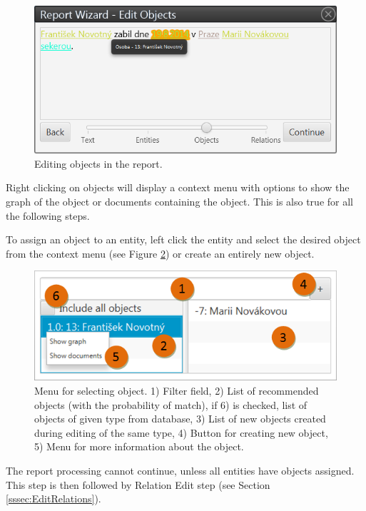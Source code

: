 \begin{figure}[!htb]
        \centering
        \includegraphics[width=\textwidth]{Images/objects}
        \caption{Editing objects in the report.}
        \label{fig:Objects}
\end{figure}

Right clicking on objects will display a context menu with options to show the
graph
of the object or documents containing the object. This is also true for all the following steps.

To assign an object to an entity, left click the entity and select the desired object
from the context menu (see Figure \ref{fig:ObjectMenu}) or create an entirely new
object.

\begin{figure}[!htb]
        \centering
        \includegraphics[width=\textwidth]{Images/objectmenu}
        \caption{Menu for selecting object. 1) Filter field, 2) List of
		 recommended objects (with the probability of match), if 6) is checked, list
		 of objects of given type from database, 3) List of new objects created
		 during editing of the same type, 4) Button for creating new object,
		 5) Menu for more information about the object.}
        \label{fig:ObjectMenu}
\end{figure}

The report processing cannot continue, unless all entities have objects
assigned.
This step is then followed by Relation Edit step (see Section
\ref{sssec:EditRelations}).

